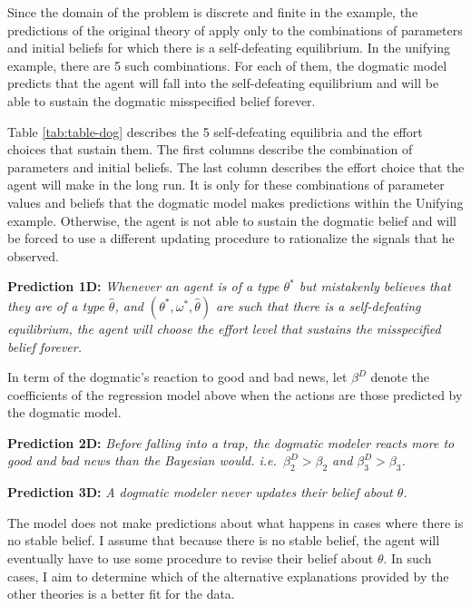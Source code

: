 \documentclass[
  12pt,
]{article}
\begin{document}
Since the domain of the problem is discrete and finite in the example,
the predictions of the original theory of \citet{Heidhues2018} apply
only to the combinations of parameters and initial beliefs for which
there is a self-defeating equilibrium. In the unifying example, there
are 5 such combinations. For each of them, the dogmatic model predicts
that the agent will fall into the self-defeating equilibrium and will be
able to sustain the dogmatic misspecified belief forever.

Table \ref{tab:table-dog} describes the 5 self-defeating equilibria and
the effort choices that sustain them. The first columns describe the
combination of parameters and initial beliefs. The last column describes
the effort choice that the agent will make in the long run. It is only
for these combinations of parameter values and beliefs that the dogmatic
model makes predictions within the Unifying example. Otherwise, the
agent is not able to sustain the dogmatic belief and will be forced to
use a different updating procedure to rationalize the signals that he
observed.

\textbf{Prediction 1D:} \emph{Whenever an agent is of a type
\(\theta^*\) but mistakenly believes that they are of a type
\(\hat{\theta}\), and \((\theta^*, \omega^*, \hat{\theta})\) are such
that there is a self-defeating equilibrium, the agent will choose the
effort level that sustains the misspecified belief forever.}

In term of the dogmatic's reaction to good and bad news, let \(\beta^D\)
denote the coefficients of the regression model above when the actions
are those predicted by the dogmatic model.

\textbf{Prediction 2D:} \emph{Before falling into a trap, the dogmatic
modeler reacts more to good and bad news than the Bayesian would.
i.e.~\(\beta_2^D>\beta_2\) and \(\beta_3^D > \beta_3\).}

\textbf{Prediction 3D:} \emph{A dogmatic modeler never updates their
belief about \(\theta\).}

The model does not make predictions about what happens in cases where
there is no stable belief. I assume that because there is no stable
belief, the agent will eventually have to use some procedure to revise
their belief about \(\theta\). In such cases, I aim to determine which
of the alternative explanations provided by the other theories is a
better fit for the data.
\end{document}
